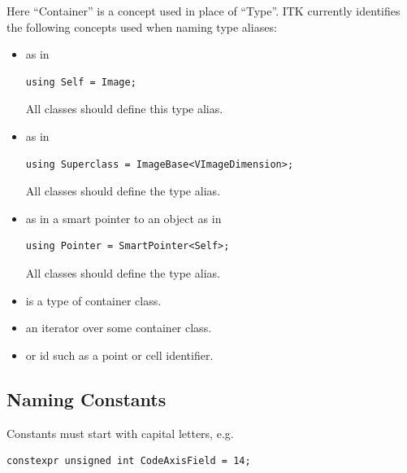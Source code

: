 Here ``Container'' is a concept used in place of ``Type''. ITK currently
identifies the following concepts used when naming type aliases:

\begin{itemize}
\item \textbf{} as in

\small
\begin{verbatim}
using Self = Image;
\end{verbatim}
\normalsize

All classes should define this type alias.
\item \textbf{} as in

\small
\begin{verbatim}
using Superclass = ImageBase<VImageDimension>;
\end{verbatim}
\normalsize

All classes should define the  type alias.
\item \textbf{} as in a smart pointer to an object as in

\begin{verbatim}
using Pointer = SmartPointer<Self>;
\end{verbatim}
\normalsize

All classes should define the  type alias.
\item \textbf{} is a type of container class.
\item \textbf{} an iterator over some container class.
\item \textbf{} or id such as a point or cell identifier.
\end{itemize}


\subsection{Naming Constants}%
\label{subsec:NamingConstants}

Constants must start with capital letters, e.g.

\small
\begin{verbatim}
constexpr unsigned int CodeAxisField = 14;
\end{verbatim}
\normalsize


